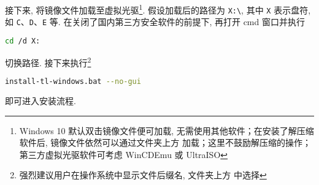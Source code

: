 \documentclass{ctexrep}
\begin{document}
接下来, 将镜像文件加载至虚拟光驱\footnote{Windows 10 默认双击镜像文件便可加载, 无需使用其他软件；在安装了解压缩软件后, 镜像文件依然可以通过文件夹上方  加载；这里不鼓励解压缩的操作；第三方虚拟光驱软件可考虑 WinCDEmu 或 UltraISO}. 
假设加载后的路径为 \texttt{X:\textbackslash}, 其中 \texttt{X} 表示盘符, 如 \texttt{C}、\texttt{D}、\texttt{E} 等. 
在关闭了国内第三方安全软件的前提下, 再打开 \textsf{cmd} 窗口并执行
\begin{lstlisting}[language = bash]
  cd /d X:
\end{lstlisting}
切换路径. 
接下来执行\footnote{强烈建议用户在操作系统中显示文件后缀名, 文件夹上方  中选择 }
\begin{lstlisting}[language = bash]
  install-tl-windows.bat --no-gui
\end{lstlisting}
即可进入安装流程. 
\end{document}

